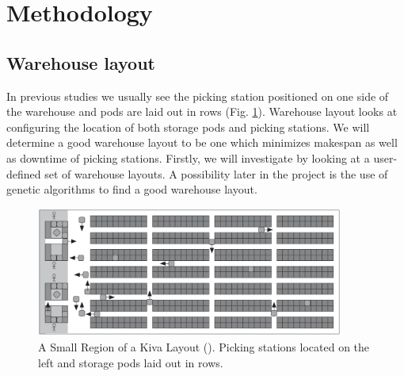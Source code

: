 \documentclass[a4paper,11pt]{article}
\begin{document}






\section{Methodology}
\label{method}

\subsection{Warehouse layout}
\label{warehouselayout}
In previous studies we usually see the picking station positioned on one side of the warehouse and pods are laid out in rows (Fig. \ref{kivalayout1}). Warehouse layout looks at configuring the location of both storage pods and picking stations. We will determine a good warehouse layout to be one which minimizes makespan as well as downtime of picking stations. Firstly, we will investigate by looking at a user-defined set of warehouse layouts. A possibility later in the project is the use of genetic algorithms to find a good warehouse layout. 

\begin{figure}[h]
	\centering
	\includegraphics[width=0.9\textwidth]{graphics/kivasystemlayout}
	\caption{A Small Region of a Kiva Layout (\cite{wurman2008coordinating}). Picking stations located on the left and storage pods laid out in rows.}
	\label{kivalayout1}
\end{figure}
\end{document}

